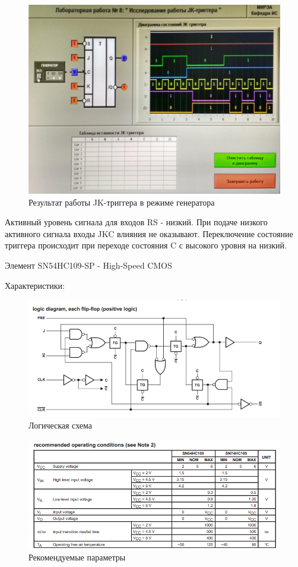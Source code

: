 \begin{figure}[H]
	\centering
	\includegraphics[width=0.95\linewidth]{imgs/8/2}
	\caption{Результат работы JK-триггера в режиме генератора}
	\label{fig:8_2}
\end{figure}

Активный уровень сигнала для входов RS - низкий.
При подаче низкого активного сигнала входы JKC влияния не оказывают.
Переключение состояние триггера происходит при переходе состояния C с высокого уровня на низкий.

Элемент SN54HC109-SP - High-Speed CMOS

Характеристики:

\begin{figure}[H]
	\centering
	\includegraphics[width=0.95\linewidth]{imgs/8/ti1}
	\caption{Логическая схема}
	\label{fig:8_ti1}
\end{figure}

\begin{figure}[H]
	\centering
	\includegraphics[width=0.95\linewidth]{imgs/8/ti2}
	\caption{Рекомендуемые параметры}
	\label{fig:8_ti2}
\end{figure}

